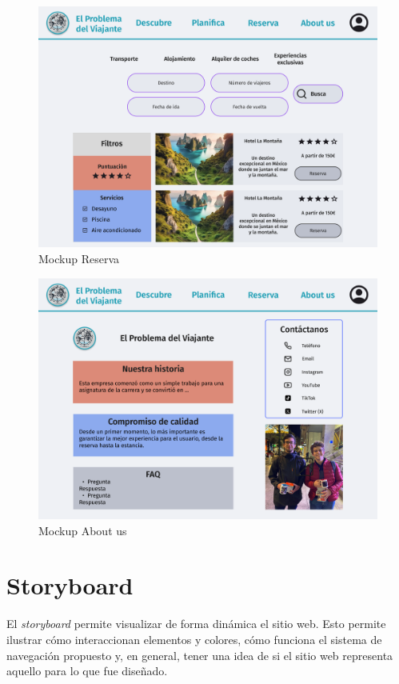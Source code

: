 \documentclass[11pt, a4paper]{book}
\begin{document}
	\begin{figure} [H]
		\centering
		\includegraphics[width=\textwidth]{mockup-reserva.png}
		\caption{Mockup Reserva}
	\end{figure}
	
	\begin{figure} [H]
		\centering
		\includegraphics[width=\textwidth]{mockup-about_us.png}
		\caption{Mockup About us}
	\end{figure}


	\newpage
	\section{Storyboard}
	El \textit{storyboard} permite visualizar de forma dinámica el sitio web. Esto permite ilustrar cómo interaccionan elementos y colores, cómo funciona el sistema de navegación propuesto y, en general, tener una idea de si el sitio web representa aquello para lo que fue diseñado.
	
\end{document}
